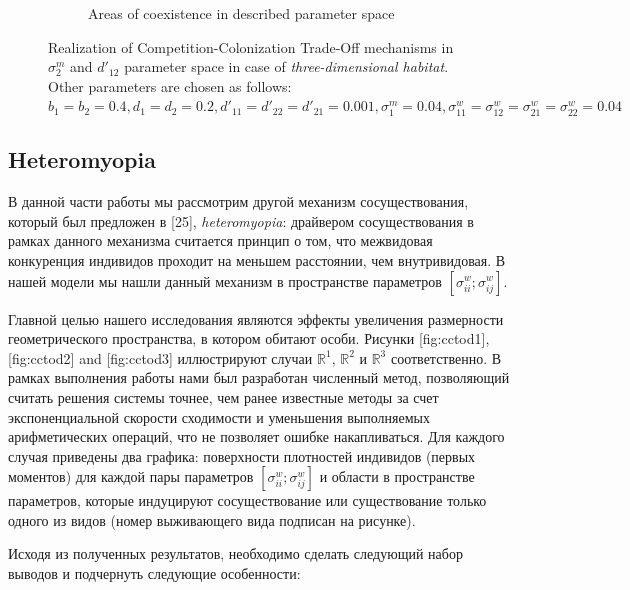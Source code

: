 \begin{figure}
\begin{subfigure}{.5\textwidth}
	\caption{Areas of coexistence in described parameter space}
	\label{fig:cctod3:sub4}
\end{subfigure}
	\caption{Realization of Competition-Colonization Trade-Off mechanisms in $\sigma^m_2$ and $d'_{12}$ parameter space in case of \emph{three-dimensional habitat}. Other parameters are chosen as follows:  $b_{1}=b_{2}=0.4
		, d_{1}=d_{2}=0.2
		, d'_{11}=d'_{22}=d'_{21}=0.001,
		\sigma_{1}^{m}=0.04
		, \sigma_{11}^{w}=\sigma_{12}^{w}=\sigma_{21}^{w}=\sigma_{22}^{w}=0.04$}
	\label{fig:cctod3}
\end{figure}



\subsection{Heteromyopia}

В данной части работы мы рассмотрим другой механизм сосуществования, который был предложен в [25], \textit{heteromyopia}: драйвером сосуществования в рамках данного механизма считается принцип о том, что межвидовая конкуренция индивидов проходит на меньшем расстоянии, чем внутривидовая. В нашей модели мы нашли данный механизм в пространстве параметров $ \left[\sigma_{ii}^{w};\sigma_{ij}^{w}\right] $.

Главной целью нашего исследования являются эффекты увеличения размерности геометрического пространства, в котором обитают особи. Рисунки [fig:cctod1], [fig:cctod2] and [fig:cctod3] иллюстрируют случаи $ \mathbb{R}^{1} $, $ \mathbb{R}^{2} $ и $ \mathbb{R}^{3} $ соответственно. В рамках выполнения работы нами был разработан численный метод, позволяющий считать решения системы точнее, чем ранее известные методы за счет экспоненциальной скорости сходимости и уменьшения выполняемых арифметических операций, что не позволяет ошибке накапливаться. Для каждого случая приведены два графика: поверхности плотностей индивидов (первых моментов) для каждой пары параметров $ \left[\sigma_{ii}^{w};\sigma_{ij}^{w}\right] $ и области в пространстве параметров, которые индуцируют сосуществование или существование только одного из видов (номер выживающего вида подписан на рисунке).

Исходя из полученных результатов, необходимо сделать следующий набор выводов и подчернуть следующие особенности:

